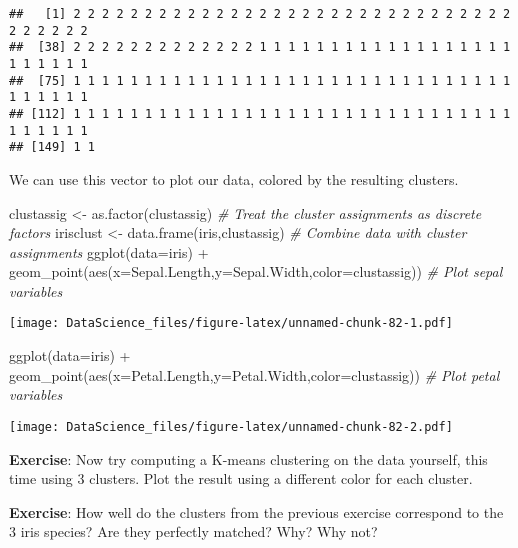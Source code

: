 \documentclass[
]{book}
\newenvironment{Shaded}{\begin{snugshade}}{\end{snugshade}}
\newcommand{\AttributeTok}[1]{\textcolor[rgb]{0.77,0.63,0.00}{#1}}
\newcommand{\CommentTok}[1]{\textcolor[rgb]{0.56,0.35,0.01}{\textit{#1}}}
\newcommand{\FunctionTok}[1]{\textcolor[rgb]{0.00,0.00,0.00}{#1}}
\newcommand{\NormalTok}[1]{#1}
\newcommand{\OtherTok}[1]{\textcolor[rgb]{0.56,0.35,0.01}{#1}}
\newcommand{\SpecialCharTok}[1]{\textcolor[rgb]{0.00,0.00,0.00}{#1}}
\begin{document}
\begin{verbatim}
##   [1] 2 2 2 2 2 2 2 2 2 2 2 2 2 2 2 2 2 2 2 2 2 2 2 2 2 2 2 2 2 2 2 2 2 2 2 2 2
##  [38] 2 2 2 2 2 2 2 2 2 2 2 2 2 1 1 1 1 1 1 1 1 1 1 1 1 1 1 1 1 1 1 1 1 1 1 1 1
##  [75] 1 1 1 1 1 1 1 1 1 1 1 1 1 1 1 1 1 1 1 1 1 1 1 1 1 1 1 1 1 1 1 1 1 1 1 1 1
## [112] 1 1 1 1 1 1 1 1 1 1 1 1 1 1 1 1 1 1 1 1 1 1 1 1 1 1 1 1 1 1 1 1 1 1 1 1 1
## [149] 1 1
\end{verbatim}

We can use this vector to plot our data, colored by the resulting clusters.

\begin{Shaded}
\begin{Highlighting}[]
\NormalTok{clustassig }\OtherTok{\textless{}{-}} \FunctionTok{as.factor}\NormalTok{(clustassig) }\CommentTok{\# Treat the cluster assignments as discrete factors}
\NormalTok{irisclust }\OtherTok{\textless{}{-}} \FunctionTok{data.frame}\NormalTok{(iris,clustassig) }\CommentTok{\# Combine data with cluster assignments}
\FunctionTok{ggplot}\NormalTok{(}\AttributeTok{data=}\NormalTok{iris) }\SpecialCharTok{+} \FunctionTok{geom\_point}\NormalTok{(}\FunctionTok{aes}\NormalTok{(}\AttributeTok{x=}\NormalTok{Sepal.Length,}\AttributeTok{y=}\NormalTok{Sepal.Width,}\AttributeTok{color=}\NormalTok{clustassig)) }\CommentTok{\# Plot sepal variables}
\end{Highlighting}
\end{Shaded}

\texttt{[image: DataScience\_files/figure-latex/unnamed-chunk-82-1.pdf]}

\begin{Shaded}
\begin{Highlighting}[]
\FunctionTok{ggplot}\NormalTok{(}\AttributeTok{data=}\NormalTok{iris) }\SpecialCharTok{+} \FunctionTok{geom\_point}\NormalTok{(}\FunctionTok{aes}\NormalTok{(}\AttributeTok{x=}\NormalTok{Petal.Length,}\AttributeTok{y=}\NormalTok{Petal.Width,}\AttributeTok{color=}\NormalTok{clustassig)) }\CommentTok{\# Plot petal variables}
\end{Highlighting}
\end{Shaded}

\texttt{[image: DataScience\_files/figure-latex/unnamed-chunk-82-2.pdf]}

\textbf{Exercise}: Now try computing a K-means clustering on the data yourself, this time using 3 clusters. Plot the result using a different color for each cluster.

\textbf{Exercise}: How well do the clusters from the previous exercise correspond to the 3 iris species? Are they perfectly matched? Why? Why not?
\end{document}

